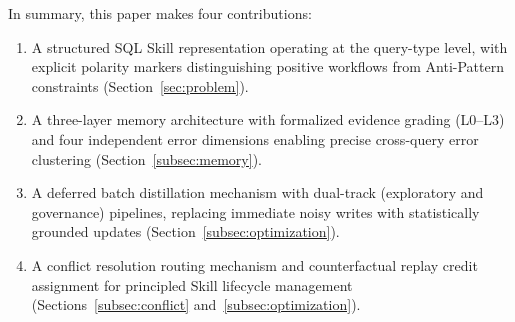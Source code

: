 In summary, this paper makes four contributions:
\begin{enumerate}[leftmargin=*,nosep]
  \item A structured SQL Skill representation operating at the query-type level, with explicit polarity markers distinguishing positive workflows from Anti-Pattern constraints (Section~\ref{sec:problem}).
  \item A three-layer memory architecture with formalized evidence grading (L0--L3) and four independent error dimensions enabling precise cross-query error clustering (Section~\ref{subsec:memory}).
  \item A deferred batch distillation mechanism with dual-track (exploratory and governance) pipelines, replacing immediate noisy writes with statistically grounded updates (Section~\ref{subsec:optimization}).
  \item A conflict resolution routing mechanism and counterfactual replay credit assignment for principled Skill lifecycle management (Sections~\ref{subsec:conflict} and~\ref{subsec:optimization}).
\end{enumerate}


